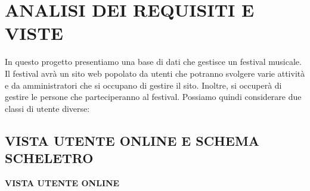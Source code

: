 \documentclass{article}
\begin{document}


\tableofcontents


\newpage






\section{ANALISI DEI REQUISITI E VISTE}
In questo progetto presentiamo una base di dati che gestisce un festival musicale. \cite{Sanremo:1} Il festival avrà un sito web popolato da utenti che potranno svolgere varie attività e da amministratori che si occupano di gestire il sito. Inoltre, si occuperà di gestire le persone che parteciperanno al festival. 
Possiamo quindi considerare due classi di utente diverse:



\subsection{VISTA UTENTE ONLINE E SCHEMA SCHELETRO}
\textbf{\newline}
\textbf{VISTA UTENTE ONLINE}
\end{document}

